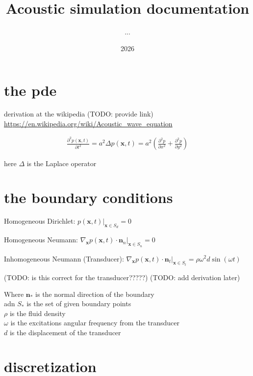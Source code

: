 \documentclass{article}
\title{Acoustic simulation documentation}
\author{...}
\date{2026}
\newcommand{\pd}[2]{\frac{\partial #1}{\partial #2}}
\newcommand{\at}[2]{\left. #1 \right\rvert_{#2}}
\numberwithin{equation}{section}
\begin{document}
\maketitle
\thispagestyle{empty}      %

\newpage

\setcounter{tocdepth}{4}
\tableofcontents  %
\newpage           %


\section{the pde}

derivation at the wikipedia (TODO: provide link) \\
\url{https://en.wikipedia.org/wiki/Acoustic\_wave\_equation}

\begin{align}
	\pd{^2p(\bm x,t)}{t^2} = a^2 \Delta p(\bm x,t) = a^2 \left( \pd{^2p}{x^2} + \pd{^2p}{y^2} \right)
\end{align}

here $\Delta$ is the Laplace operator

\section{the boundary conditions}

Homogeneous Dirichlet: $\at{p(\bm x,t)}{\bm x \in S_d}=0$

Homogeneous Neumann: $\at{\nabla_{\bm x}p(\bm x,t)\cdot\bm n_n}{\bm x \in S_n} = 0$ %

Inhomogeneous Neumann (Transducer): $\at{\nabla_{\bm x}p(\bm x,t)\cdot\bm n_t}{\bm x \in S_t} = \rho\omega^2d\sin(\omega t)$ %

(TODO: is this correct for the transducer?????)
(TODO: add derivation later)

Where $\bm n_*$ is the normal direction of the boundary\\
adn $S_*$ is the set of given boundary points \\
$\rho$ is the fluid density\\
$\omega$ is the excitations angular frequency from the transducer\\
$d$ is the displacement of the transducer

\section{discretization}
\end{document}

